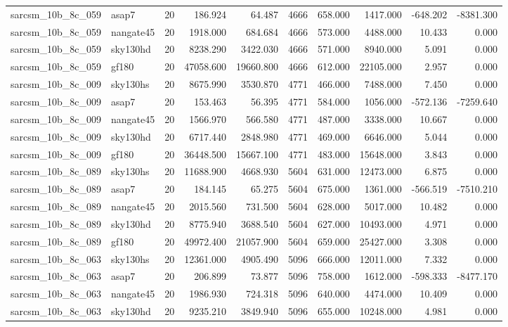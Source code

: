 \begin{tabular}{llrrrrrrrr}
sarcsm\_10b\_8c\_059 & asap7 & 20 & 186.924 & 64.487 & 4666 & 658.000 & 1417.000 & -648.202 & -8381.300 \\
sarcsm\_10b\_8c\_059 & nangate45 & 20 & 1918.000 & 684.684 & 4666 & 573.000 & 4488.000 & 10.433 & 0.000 \\
sarcsm\_10b\_8c\_059 & sky130hd & 20 & 8238.290 & 3422.030 & 4666 & 571.000 & 8940.000 & 5.091 & 0.000 \\
sarcsm\_10b\_8c\_059 & gf180 & 20 & 47058.600 & 19660.800 & 4666 & 612.000 & 22105.000 & 2.957 & 0.000 \\
sarcsm\_10b\_8c\_009 & sky130hs & 20 & 8675.990 & 3530.870 & 4771 & 466.000 & 7488.000 & 7.450 & 0.000 \\
sarcsm\_10b\_8c\_009 & asap7 & 20 & 153.463 & 56.395 & 4771 & 584.000 & 1056.000 & -572.136 & -7259.640 \\
sarcsm\_10b\_8c\_009 & nangate45 & 20 & 1566.970 & 566.580 & 4771 & 487.000 & 3338.000 & 10.667 & 0.000 \\
sarcsm\_10b\_8c\_009 & sky130hd & 20 & 6717.440 & 2848.980 & 4771 & 469.000 & 6646.000 & 5.044 & 0.000 \\
sarcsm\_10b\_8c\_009 & gf180 & 20 & 36448.500 & 15667.100 & 4771 & 483.000 & 15648.000 & 3.843 & 0.000 \\
sarcsm\_10b\_8c\_089 & sky130hs & 20 & 11688.900 & 4668.930 & 5604 & 631.000 & 12473.000 & 6.875 & 0.000 \\
sarcsm\_10b\_8c\_089 & asap7 & 20 & 184.145 & 65.275 & 5604 & 675.000 & 1361.000 & -566.519 & -7510.210 \\
sarcsm\_10b\_8c\_089 & nangate45 & 20 & 2015.560 & 731.500 & 5604 & 628.000 & 5017.000 & 10.482 & 0.000 \\
sarcsm\_10b\_8c\_089 & sky130hd & 20 & 8775.940 & 3688.540 & 5604 & 627.000 & 10493.000 & 4.971 & 0.000 \\
sarcsm\_10b\_8c\_089 & gf180 & 20 & 49972.400 & 21057.900 & 5604 & 659.000 & 25427.000 & 3.308 & 0.000 \\
sarcsm\_10b\_8c\_063 & sky130hs & 20 & 12361.000 & 4905.490 & 5096 & 666.000 & 12011.000 & 7.332 & 0.000 \\
sarcsm\_10b\_8c\_063 & asap7 & 20 & 206.899 & 73.877 & 5096 & 758.000 & 1612.000 & -598.333 & -8477.170 \\
sarcsm\_10b\_8c\_063 & nangate45 & 20 & 1986.930 & 724.318 & 5096 & 640.000 & 4474.000 & 10.409 & 0.000 \\
sarcsm\_10b\_8c\_063 & sky130hd & 20 & 9235.210 & 3849.940 & 5096 & 655.000 & 10248.000 & 4.981 & 0.000 \\

\end{tabular}

